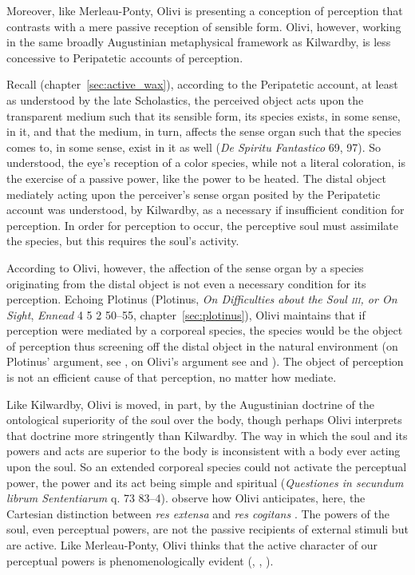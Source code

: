Moreover, like Merleau-Ponty, Olivi is presenting a conception of perception that contrasts with a mere passive reception of sensible form. Olivi, however, working in the same broadly Augustinian metaphysical framework as Kilwardby, is less concessive to Peripatetic accounts of perception. 

Recall (chapter~\ref{sec:active_wax}), according to the Peripatetic account, at least as understood by the late Scholastics, the perceived object acts upon the transparent medium such that its sensible form, its species exists, in some sense, in it, and that the medium, in turn, affects the sense organ such that the species comes to, in some sense, exist in it as well (\emph{De Spiritu Fantastico} 69, 97). So understood, the eye's reception of a color species, while not a literal coloration, is the exercise of a passive power, like the power to be heated. The distal object mediately acting upon the perceiver's sense organ posited by the Peripatetic account was understood, by Kilwardby, as a necessary if insufficient condition for perception. In order for perception to occur, the perceptive soul must assimilate the species, but this requires the soul's activity. 

According to Olivi, however, the affection of the sense organ by a species originating from the distal object is not even a necessary condition for its perception. Echoing Plotinus (Plotinus, \emph{On Difficulties about the Soul \textsc{iii}, or On Sight}, \emph{Ennead} 4 5 2 50–55, chapter~\ref{sec:plotinus}), Olivi maintains that if perception were mediated by a corporeal species, the species would be the object of perception thus screening off the distal object in the natural environment (on Plotinus' argument, see \citealt[chapter 3]{Emilsson:1988uq}, on Olivi's argument see \citealt[43--45, especially n. 53]{Tachau:1988aa} and \citealt[chapter 7.3]{Pasnau:1997aa}). The object of perception is not an efficient cause of that perception, no matter how mediate. 

Like Kilwardby, Olivi is moved, in part, by the Augustinian doctrine of the ontological superiority of the soul over the body, though perhaps Olivi interprets that doctrine more stringently than Kilwardby. The way in which the soul and its powers and acts are superior to the body is inconsistent with a body ever acting upon the soul. So an extended corporeal species could not activate the perceptual power, the power and its act being simple and spiritual (\emph{Questiones in secundum librum Sententiarum} q. 73 83--4). \citet[263]{Silva:2010zh} observe how Olivi anticipates, here, the Cartesian distinction between \emph{res extensa} and \emph{res cogitans} \citep[see also][46]{Tachau:1988aa}. The powers of the soul, even perceptual powers, are not the passive recipients of external stimuli but are active. Like Merleau-Ponty, Olivi thinks that the active character of our perceptual powers is phenomenologically evident (\citealt[3--26, 39---54]{Tachau:1988aa}, \citealt[236--47]{Pasnau:1997aa}, \citealt[143]{Toivanen:2013ul}). 

